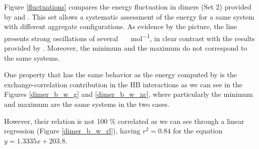 \newpage

Figure \ref{fluctuations} compares the energy fluctuation in dimers (Set 2)
provided by {} and {}. This set allows a systematic
assessment of the energy for a same system with different aggregate
configurations. As evidence by the picture, the {} line presents
strong oscillations of several \SI{}{\kilo\calorie\per\mole}, in clear contrast
with the results provided by {}. Moreover, the minimum and the
maximum do not correspond to the same systems.

One property that has the same behavior as the energy computed by
{} is the exchange-correlation contribution in the HB
interactions as we can see in the Figures \ref{dimer_b_w_g} and
\ref{dimer_b_w_xc}, where particularly the minimum and maximum are the same
systems in the two cases.

However, their relation is not 100 \% correlated as we can see through a linear
regression (Figure \ref{dimer_b_w_rl}), having $r^2 = 0.84$ for the equation $y
= 1.3335x + 203.8$.

